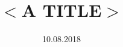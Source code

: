 \documentclass[a4paper, 10pt, oneside]{memoir}
\title				{$<$A TITLE$>$}
\date				{10.08.2018}
\begin{document}

\thesisfront
\maketitle
\pagestyle{thesis}


\thesistoc
\thesismain





%
%
\thesisappendix
\thesisbib
\begin{appendices}
	 
\end{appendices}
\thesisback

\end{document}
